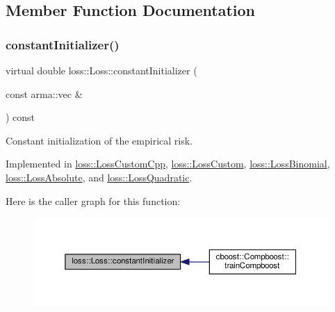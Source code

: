 \subsection{Member Function Documentation}
\mbox{\label{classloss_1_1_loss_a65fe7dcd9370e6a549b8d1cc95fc8798}} 
\subsubsection{\texorpdfstring{constant\+Initializer()}{constantInitializer()}}
{\footnotesize\ttfamily virtual double loss\+::\+Loss\+::constant\+Initializer (\begin{DoxyParamCaption}\item[{const arma\+::vec \&}]{ }\end{DoxyParamCaption}) const\hspace{0.3cm}{\ttfamily [pure virtual]}}



Constant initialization of the empirical risk. 



Implemented in \hyperlink{classloss_1_1_loss_custom_cpp_af6d7652231c313abe11009e44b51d0b1}{loss\+::\+Loss\+Custom\+Cpp}, \hyperlink{classloss_1_1_loss_custom_a0c8abe2bf210898813d2f9e5049cc1e8}{loss\+::\+Loss\+Custom}, \hyperlink{classloss_1_1_loss_binomial_a21c384401aa0ef9b2db379e6822c3570}{loss\+::\+Loss\+Binomial}, \hyperlink{classloss_1_1_loss_absolute_a5272a952bf768a7bd790318b2f9cdcd6}{loss\+::\+Loss\+Absolute}, and \hyperlink{classloss_1_1_loss_quadratic_a8519141a797078485d04038ad44a4592}{loss\+::\+Loss\+Quadratic}.

Here is the caller graph for this function\+:
\nopagebreak
\begin{figure}[H]
\begin{center}
\leavevmode
\includegraphics[width=350pt]{classloss_1_1_loss_a65fe7dcd9370e6a549b8d1cc95fc8798_icgraph}
\end{center}
\end{figure}
\mbox{\label{classloss_1_1_loss_a267a4de70747ade4b2d84ce35a448979}} 
